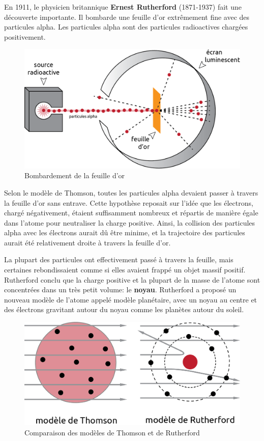 \documentclass[
  11pt,
  a4paper,
  openany]{book}
\begin{document}
En 1911, le physicien britannique \textbf{Ernest Rutherford} (1871-1937) fait une découverte importante. Il bombarde une feuille d'or extrêmement fine avec des particules alpha. Les particules alpha sont des particules radioactives chargées positivement.

\begin{figure}

{\centering \includegraphics[width=0.4\linewidth]{images/exp-rutherford} 

}

\caption{Bombardement de la feuille d'or}\label{fig:exp-rutherford}
\end{figure}

Selon le modèle de Thomson, toutes les particules alpha devaient passer à travers la feuille d'or sans entrave. Cette hypothèse reposait sur l'idée que les électrons, chargé négativement, étaient suffisamment nombreux et répartis de manière égale dans l'atome pour neutraliser la charge positive. Ainsi, la collision des particules alpha avec les électrons aurait dû être minime, et la trajectoire des particules aurait été relativement droite à travers la feuille d'or.

La plupart des particules ont effectivement passé à travers la feuille, mais certaines rebondissaient comme si elles avaient frappé un objet massif positif. Rutherford conclu que la charge positive et la plupart de la masse de l'atome sont concentrées dans un très petit volume: le \textbf{noyau}. Rutherford a proposé un nouveau modèle de l'atome appelé modèle planétaire, avec un noyau au centre et des électrons gravitant autour du noyau comme les planètes autour du soleil.

\begin{figure}

{\centering \includegraphics[width=0.4\linewidth]{images/exp-thomson-rutherford} 

}

\caption{Comparaison des modèles de Thomson et de Rutherford}\label{fig:exp-thomson-rutherford}
\end{figure}
\end{document}
